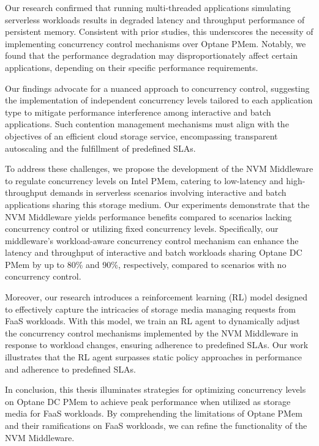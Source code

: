 Our research confirmed that running multi-threaded applications simulating serverless workloads results in degraded latency and throughput performance of persistent memory. Consistent with prior studies, this underscores the necessity of implementing concurrency control mechanisms over Optane PMem. Notably, we found that the performance degradation may disproportionately affect certain applications, depending on their specific performance requirements.

Our findings advocate for a nuanced approach to concurrency control, suggesting the implementation of independent concurrency levels tailored to each application type to mitigate performance interference among interactive and batch applications. Such contention management mechanisms must align with the objectives of an efficient cloud storage service, encompassing transparent autoscaling and the fulfillment of predefined SLAs.

To address these challenges, we propose the development of the NVM Middleware to regulate concurrency levels on Intel PMem, catering to low-latency and high-throughput demands in serverless scenarios involving interactive and batch applications sharing this storage medium. Our experiments demonstrate that the NVM Middleware yields performance benefits compared to scenarios lacking concurrency control or utilizing fixed concurrency levels. Specifically, our middleware's workload-aware concurrency control mechanism can enhance the latency and throughput of interactive and batch workloads sharing Optane DC PMem by up to 80\% and 90\%, respectively, compared to scenarios with no concurrency control. 


Moreover, our research introduces a reinforcement learning (RL) model designed to effectively capture the intricacies of storage media managing requests from FaaS workloads. With this model, we train an RL agent to dynamically adjust the concurrency control mechanisms implemented by the NVM Middleware in response to workload changes, ensuring adherence to predefined SLAs. Our work illustrates that the RL agent surpasses static policy approaches in performance and adherence to predefined SLAs.

In conclusion, this thesis illuminates strategies for optimizing concurrency levels on Optane DC PMem to achieve peak performance when utilized as storage media for FaaS workloads. By comprehending the limitations of Optane PMem and their ramifications on FaaS workloads, we can refine the functionality of the NVM Middleware.